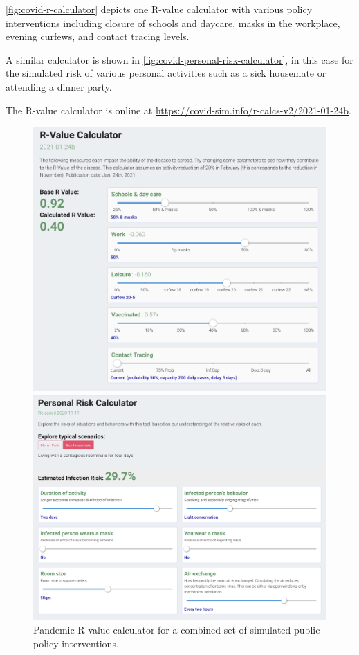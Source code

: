 \autoref{fig:covid-r-calculator} depicts one R-value calculator with various policy interventions including closure of schools and daycare, masks in the workplace, evening curfews, and contact tracing levels.

A similar calculator is shown in \autoref{fig:covid-personal-risk-calculator}, in this case for the simulated risk of various personal activities such as a sick housemate or attending a dinner party.

The R-value calculator is online at \url{https://covid-sim.info/r-calcs-v2/2021-01-24b}.

\begin{figure}
  \centering
	\begin{minipage}{0.44\textwidth}
    \includegraphics[width=\textwidth]{chapters/21-covid-sim/images/covid-r-value-calculator.png}
  \caption{Pandemic R-value calculator for a combined set of simulated public policy interventions.}
  \label{fig:covid-r-calculator}
	\end{minipage} \begin{minipage}{0.515\textwidth}
    \includegraphics[width=\textwidth]{chapters/21-covid-sim/images/covid-personal-risk-calculator.png}

\end{minipage}
\end{figure}
